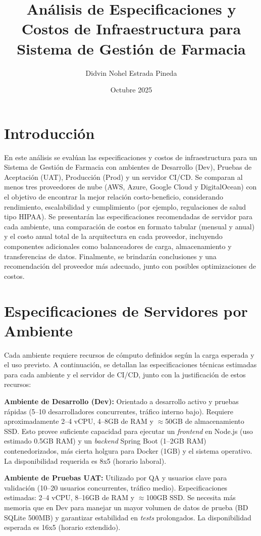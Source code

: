 \documentclass[12pt]{article}
\title{Análisis de Especificaciones y Costos de Infraestructura para Sistema de Gestión de Farmacia}
\author{Didvin Nohel Estrada Pineda}
\date{Octubre 2025}
\begin{document}
\maketitle

\section{Introducción}
En este análisis se evalúan las especificaciones y costos de infraestructura para un Sistema de Gestión de Farmacia con ambientes de Desarrollo (Dev), Pruebas de Aceptación (UAT), Producción (Prod) y un servidor CI/CD. Se comparan al menos tres proveedores de nube (AWS, Azure, Google Cloud y DigitalOcean) con el objetivo de encontrar la mejor relación costo-beneficio, considerando rendimiento, escalabilidad y cumplimiento (por ejemplo, regulaciones de salud tipo HIPAA). Se presentarán las especificaciones recomendadas de servidor para cada ambiente, una comparación de costos en formato tabular (mensual y anual) y el costo anual total de la arquitectura en cada proveedor, incluyendo componentes adicionales como balanceadores de carga, almacenamiento y transferencias de datos. Finalmente, se brindarán conclusiones y una recomendación del proveedor más adecuado, junto con posibles optimizaciones de costos.

\section{Especificaciones de Servidores por Ambiente}
Cada ambiente requiere recursos de cómputo definidos según la carga esperada y el uso previsto. A continuación, se detallan las especificaciones técnicas estimadas para cada ambiente y el servidor de CI/CD, junto con la justificación de estos recursos:

\textbf{Ambiente de Desarrollo (Dev):} Orientado a desarrollo activo y pruebas rápidas (5--10 desarrolladores concurrentes, tráfico interno bajo). Requiere aproximadamente 2--4 vCPU, 4--8GB de RAM y \(\approx\)50GB de almacenamiento SSD. Esto provee suficiente capacidad para ejecutar un \emph{frontend} en Node.js (uso estimado 0.5GB RAM) y un \emph{backend} Spring Boot (1--2GB RAM) contenedorizados, más cierta holgura para Docker (1GB) y el sistema operativo. La disponibilidad requerida es 8x5 (horario laboral).

\textbf{Ambiente de Pruebas UAT:} Utilizado por QA y usuarios clave para validación (10--20 usuarios concurrentes, tráfico medio). Especificaciones estimadas: 2--4 vCPU, 8--16GB de RAM y \(\approx\)100GB SSD. Se necesita más memoria que en Dev para manejar un mayor volumen de datos de prueba (BD SQLite 500MB) y garantizar estabilidad en \emph{tests} prolongados. La disponibilidad esperada es 16x5 (horario extendido).
\end{document}
